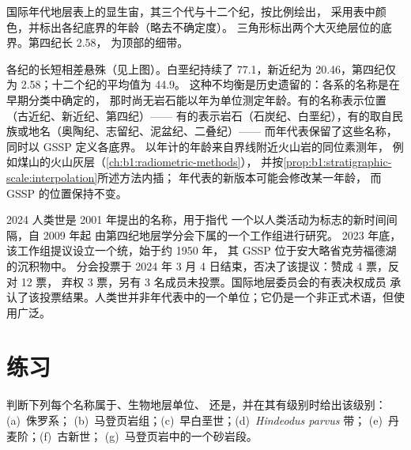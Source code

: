 \begin{omfigure}
{\small 国际年代地层表上的显生宙，其三个代与十二个纪，按比例绘出，
采用表中颜色，并标出各纪底界的年龄（略去不确定度）。
三角形标出两个大灭绝层位的底界。第四纪长
\qty{2.58}{\Ma}，
为顶部的细带。}
\label{fig:b1:stratigraphic-scale:chart}
\end{omfigure}

各纪的长短相差悬殊（见上图）。白垩纪持续了
\qty{77.1}{\Ma}，新近纪为 \qty{20.46}{\Ma}，第四纪仅为
\qty{2.58}{\Ma}；十二个纪的平均值为 \qty{44.9}{\Ma}。
这种不均衡是历史遗留的：各系的名称是在早期分类中确定的，
那时尚无岩石能以年为单位测定年龄。有的名称表示位置（古近纪、新近纪、第四纪）——
有的表示岩石（石炭纪、白垩纪），有的取自民族或地名（奥陶纪、志留纪、泥盆纪、二叠纪）——
而年代表保留了这些名称，同时以 GSSP 定义各底界。
以年计的年龄来自界线附近火山岩的同位素测年，
例如煤山的火山灰层（\cref{ch:b1:radiometric-methods}），
并按\cref{prop:b1:stratigraphic-scale:interpolation}所述方法内插；
年代表的新版本可能会修改某一年龄，
而 GSSP 的位置保持不变。

\begin{dated}{2024}
人类世是 2001 年提出的名称，用于指代
一个以人类活动为标志的新时间间隔，自 2009 年起
由第四纪地层学分会下属的一个工作组进行研究。
2023 年底，该工作组提议设立一个统，始于约 1950 年，
其 GSSP 位于安大略省克劳福德湖的沉积物中。
分会投票于 2024 年 3 月 4 日结束，否决了该提议：赞成 4 票，反对 12 票，
弃权 3 票，另有 3 名成员未投票。国际地层委员会的有表决权成员
承认了该投票结果。人类世并非年代表中的一个单位；它仍是一个非正式术语，但使用广泛。
\end{dated}

\section{练习}

\begin{exercise}[$\star$]\label{exo:b1:stratigraphic-scale:1}
判断下列每个名称属于、生物地层单位、
还是，并在其有级别时给出该级别：(a)~侏罗系；
(b)~马登页岩组；(c)~早白垩世；(d)~\emph{Hindeodus parvus} 带；
(e)~丹麦阶；(f)~古新世；
(g)~马登页岩中的一个砂岩段。
\end{exercise}

